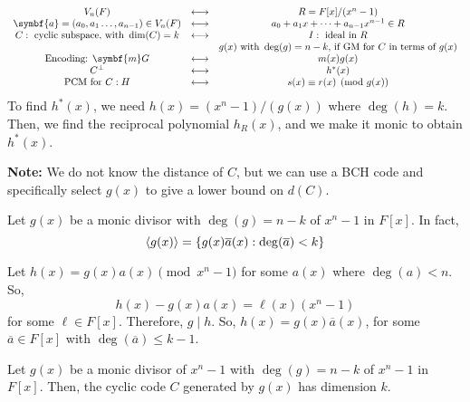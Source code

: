 
\[
    \begin{array}{ccc}
        V_n(F)                                       & \longleftrightarrow & R=F[x]/(x^n-1)                      \\
        \symbf{a}=(a_0,a_1\ldots ,a_{n-1})\in V_n(F) & \longleftrightarrow & a_0+a_1x+\cdots+a_{n-1}x^{n-1}\in R \\
        C: \text{ cyclic subspace, with } \dim(C)=k  & \longleftrightarrow & I:\text{ ideal in } R               \\
                                                     &                     & g(x) \text{ with } \deg(g)=n-k
        \text{, if GM for $ C $ in terms of $ g(x)$}                                                             \\
        \text{Encoding: $ \symbf{m}G $}              & \longleftrightarrow & m(x)g(x)                            \\
        C^{\perp}                                    & \longleftrightarrow & h^*(x)                              \\
        \text{PCM for } C: H                         & \longleftrightarrow & s(x)\equiv r(x)\pmod{g(x)}
    \end{array}
\]
To find $ h^*(x) $, we need $ h(x)=(x^n-1)/(g(x)) $ where $ \deg(h)=k $. Then,
we find the reciprocal polynomial $ h_R(x) $, and we make it monic to obtain
$ h^*(x) $.

\textbf{Note:} We do not know the distance of $ C $, but we can use a BCH
code and specifically select $ g(x) $ to give a lower bound on
$ d(C) $.

\begin{Lemma}{}{}
    Let $ g(x) $ be a monic divisor with $ \deg(g)=n-k $ of
    $ x^n-1 $ in $ F[x] $. In fact,
    \[ \langle g(x) \rangle = \{g(x)\overline{a}(x):\deg(\overline{a})<k\} \]
\end{Lemma}

\begin{Proof}{}{}
Let $ h(x)=g(x)a(x)\pmod{x^n-1} $ for some $ a(x) $ where $ \deg(a)<n $. So,
\[ h(x)-g(x)a(x)=\ell(x)(x^n-1) \]
for some $ \ell \in F[x] $. Therefore, $ g\mid h $.
So, $ h(x)=g(x)\overline{a}(x) $, for some $ \overline{a}\in F[x] $
with $ \deg(\overline{a})\leqslant k-1 $.
\end{Proof}

\begin{Theorem}{}{}
    Let $ g(x) $ be a monic divisor of $ x^n-1 $ with $ \deg(g)=n-k $ of
    $ x^n-1 $ in $ F[x] $. Then, the cyclic code $ C $ generated
    by $ g(x) $ has dimension $ k $.
\end{Theorem}

